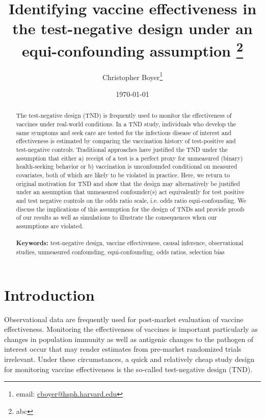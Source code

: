 \documentclass[11pt]{article}
\begin{document}
\begin{titlepage}
\title{Identifying vaccine effectiveness in the test-negative design under an equi-confounding assumption \thanks{abc}}
\author[1]{Christopher Boyer\thanks{email: \href{mailto:cboyer@hsph.harvard.edu}{cboyer@hsph.harvard.edu}}}
\date{\today}
\maketitle

\begin{abstract}
    The test-negative design (TND) is frequently used to monitor the effectiveness of vaccines under real-world conditions. In a TND study, individuals who develop the same symptoms and seek care are tested for the infectious disease of interest and effectiveness is estimated by comparing the vaccination history of test-positive and test-negative controls. Traditional approaches have justified the TND under the assumption that either a) receipt of a test is a perfect proxy for unmeasured (binary) health-seeking behavior or b) vaccination is unconfounded conditional on measured covariates, both of which are likely to be violated in practice. Here, we return to original motivation for TND and show that the design may alternatively be justified under an assumption that unmeasured confounder(s) act equivalently for test positive and test negative controls on the odds ratio scale, i.e. odds ratio equi-confounding. We discuss the implications of this assumption for the design of TNDs and provide proofs of our results as well as simulations to illustrate the consequences when our assumptions are violated.
\noindent \\
\vspace{0in} \\
\noindent\textbf{Keywords:} test-negative design, vaccine effectiveness, causal inference, observational studies, unmeasured confounding, equi-confounding, odds ratios, selection bias
\bigskip
\end{abstract}
\setcounter{page}{0}
\thispagestyle{empty}
\end{titlepage}
\pagebreak \newpage

\doublespacing

\section{Introduction} \label{sec:introduction}
Observational data are frequently used for post-market evaluation of vaccine effectiveness. Monitoring the effectiveness of vaccines is important particularly as changes in population immunity as well as antigenic changes to the pathogen of interest occur that may render estimates from pre-market randomized trials irrelevant. Under these circumstances, a quick and relatively cheap study design for monitoring vaccine effectiveness is the so-called test-negative design (TND). 
\end{document}

